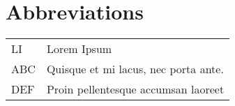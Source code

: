 \chapter*{Abbreviations}


\noindent
\begin{longtable}{@{}p{}p{}@{}}
LI & Lorem Ipsum \\
ABC & Quisque et mi lacus, nec porta ante. \\
DEF & Proin pellentesque accumsan laoreet \\
\end{longtable}

